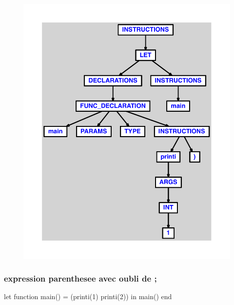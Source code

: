 \documentclass{article}
\begin{document}
\begin{figure}[H]\centering\includegraphics[max width=\textwidth]{ast/ast_34.pdf}\end{figure}\subsubsection{expression parenthesee avec oubli de ;}
\begin{verbatimtab}
let function main() = (printi(1) printi(2)) in main() end
\end{verbatimtab}
\end{document}
